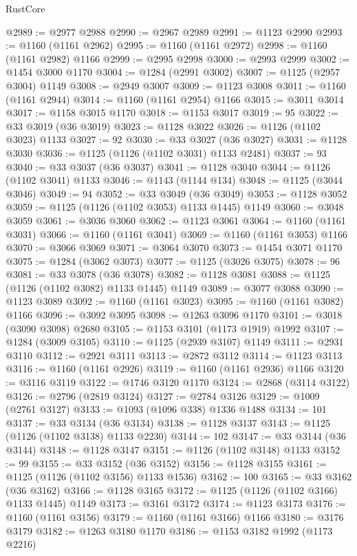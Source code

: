 \begin{lexlean}{RustCore}
\begin{coremodule}
@2989 := @2977 @2988
@2990 := @2967 @2989
@2991 := @1123 @2990
@2993 := @1160 (@1161 @2962)
@2995 := @1160 (@1161 @2972)
@2998 := @1160 (@1161 @2982) @1166
@2999 := @2995 @2998
@3000 := @2993 @2999
@3002 := @1454 @3000 @1170
@3004 := @1284 (@2991 @3002)
@3007 := @1125 (@2957 @3004) @1149
@3008 := @2949 @3007
@3009 := @1123 @3008
@3011 := @1160 (@1161 @2944)
@3014 := @1160 (@1161 @2954) @1166
@3015 := @3011 @3014
@3017 := @1158 @3015 @1170
@3018 := @1153 @3017
@3019 := 95
@3022 := @33 @3019 (@36 @3019)
@3023 := @1128 @3022
@3026 := @1126 (@1102 @3023) @1133
@3027 := 92
@3030 := @33 @3027 (@36 @3027)
@3031 := @1128 @3030
@3036 := @1125 (@1126 (@1102 @3031) @1133 @2481)
@3037 := 93
@3040 := @33 @3037 (@36 @3037)
@3041 := @1128 @3040
@3044 := @1126 (@1102 @3041) @1133
@3046 := @1143 (@1144 @134)
@3048 := @1125 (@3044 @3046)
@3049 := 94
@3052 := @33 @3049 (@36 @3049)
@3053 := @1128 @3052
@3059 := @1125 (@1126 (@1102 @3053) @1133 @1445) @1149
@3060 := @3048 @3059
@3061 := @3036 @3060
@3062 := @1123 @3061
@3064 := @1160 (@1161 @3031)
@3066 := @1160 (@1161 @3041)
@3069 := @1160 (@1161 @3053) @1166
@3070 := @3066 @3069
@3071 := @3064 @3070
@3073 := @1454 @3071 @1170
@3075 := @1284 (@3062 @3073)
@3077 := @1125 (@3026 @3075)
@3078 := 96
@3081 := @33 @3078 (@36 @3078)
@3082 := @1128 @3081
@3088 := @1125 (@1126 (@1102 @3082) @1133 @1445) @1149
@3089 := @3077 @3088
@3090 := @1123 @3089
@3092 := @1160 (@1161 @3023)
@3095 := @1160 (@1161 @3082) @1166
@3096 := @3092 @3095
@3098 := @1263 @3096 @1170
@3101 := @3018 (@3090 @3098) @2680
@3105 := @1153 @3101 (@1173 @1919) @1992
@3107 := @1284 (@3009 @3105)
@3110 := @1125 (@2939 @3107) @1149
@3111 := @2931 @3110
@3112 := @2921 @3111
@3113 := @2872 @3112
@3114 := @1123 @3113
@3116 := @1160 (@1161 @2926)
@3119 := @1160 (@1161 @2936) @1166
@3120 := @3116 @3119
@3122 := @1746 @3120 @1170
@3124 := @2868 (@3114 @3122)
@3126 := @2796 (@2819 @3124)
@3127 := @2784 @3126
@3129 := @1009 (@2761 @3127)
@3133 := @1093 (@1096 @338) @1336 @1488
@3134 := 101
@3137 := @33 @3134 (@36 @3134)
@3138 := @1128 @3137
@3143 := @1125 (@1126 (@1102 @3138) @1133 @2230)
@3144 := 102
@3147 := @33 @3144 (@36 @3144)
@3148 := @1128 @3147
@3151 := @1126 (@1102 @3148) @1133
@3152 := 99
@3155 := @33 @3152 (@36 @3152)
@3156 := @1128 @3155
@3161 := @1125 (@1126 (@1102 @3156) @1133 @1536)
@3162 := 100
@3165 := @33 @3162 (@36 @3162)
@3166 := @1128 @3165
@3172 := @1125 (@1126 (@1102 @3166) @1133 @1445) @1149
@3173 := @3161 @3172
@3174 := @1123 @3173
@3176 := @1160 (@1161 @3156)
@3179 := @1160 (@1161 @3166) @1166
@3180 := @3176 @3179
@3182 := @1263 @3180 @1170
@3186 := @1153 @3182 @1992 (@1173 @2216)

\end{coremodule}
\end{lexlean}
